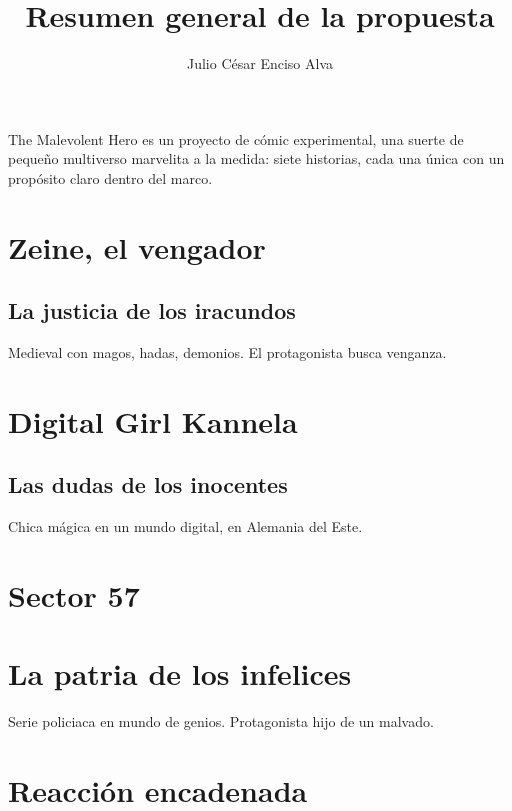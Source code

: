 \documentclass[letterpaper,12pt]{article}
\title{Resumen general de la propuesta}
\author{Julio César Enciso Alva}
\begin{document}
	
	\maketitle
	
	The Malevolent Hero es un proyecto de cómic experimental, una suerte de pequeño
	multiverso marvelita a la medida: siete historias, cada una única con un propósito claro
	dentro del marco.
	
	
	
	\newpage
	
	\section*{Zeine, el vengador}
	
	\subsection*{La justicia de los iracundos}
	
	Medieval con magos, hadas, demonios. El protagonista busca venganza.
	
	\newpage
	
	\section*{Digital Girl Kannela}
	
	\subsection*{Las dudas de los inocentes}
	
	Chica mágica en un mundo digital, en Alemania del Este.
	
	\newpage
	
	\section*{Sector 57}
	
	\section*{La patria de los infelices}
	
	Serie policiaca en mundo de genios. Protagonista hijo de un malvado.
	
	\newpage
	
	\section*{Reacción encadenada}
	
\end{document}
